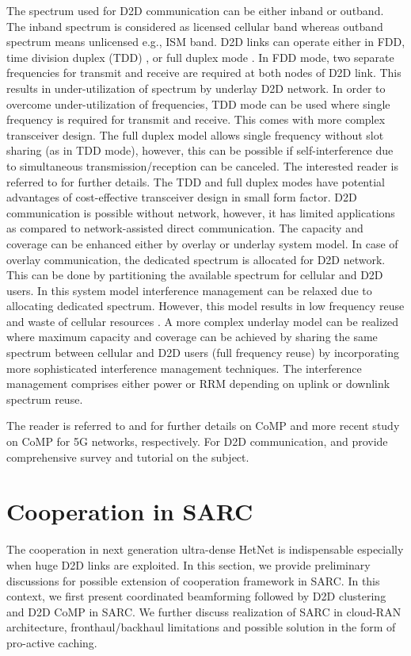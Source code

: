 \documentclass[article,10pt,twocolumn]{IEEEtran}
\begin{document}
The spectrum used for D2D communication can be either inband or outband. The inband spectrum is considered as licensed cellular band whereas outband spectrum means unlicensed e.g., ISM band. D2D links can operate either in FDD, time division duplex (TDD) \citep{6103908, 7008349, 7073589}, or full duplex mode \citep{6785425,6882650,6952081,7041028}. In FDD mode, two separate frequencies for transmit and receive are required at both nodes of D2D link. This results in under-utilization of spectrum by underlay D2D network. In order to overcome under-utilization of frequencies, TDD mode can be used where single frequency is required for transmit and receive. This comes with more complex transceiver design. The full duplex model allows single frequency without slot sharing (as in TDD mode), however, this can be possible if self-interference due to simultaneous transmission/reception can be canceled. The interested reader is referred to \citep{7041028} for further details. The TDD and full duplex modes have potential advantages of cost-effective transceiver design in small form factor. D2D communication is possible without network, however, it has limited applications as compared to network-assisted direct communication. The capacity and coverage can be enhanced either by overlay or underlay system model. In case of overlay communication, the dedicated spectrum is allocated for D2D network. This can be done by partitioning the available spectrum for cellular and D2D users. In this system model interference management can be relaxed due to allocating dedicated spectrum. However, this model results in low frequency reuse and waste of cellular resources \citep{Overlay15, mumtaz_smart_2014}. A more complex underlay model can be realized where maximum capacity and coverage can be achieved by sharing the same spectrum between cellular and D2D users (full frequency reuse) by incorporating more sophisticated interference management techniques. The interference management comprises either power or RRM depending on uplink or downlink spectrum reuse.

The reader is referred to \citep{5706317} and \citep{6888496} for further details on CoMP and more recent study on CoMP for 5G networks, respectively. For D2D communication, \citep{6805125} and \citep{6970763} provide comprehensive survey and tutorial on the subject.
\section{Cooperation in SARC}\label{sec:coop}
The cooperation in next generation ultra-dense HetNet is indispensable especially when huge D2D links are exploited. In this section, we provide preliminary discussions for possible extension of cooperation framework in SARC. In this context, we first present coordinated beamforming followed by D2D clustering and D2D CoMP in SARC. We further discuss realization of SARC in cloud-RAN architecture, fronthaul/backhaul limitations and possible solution in the form of pro-active caching.
\end{document}

